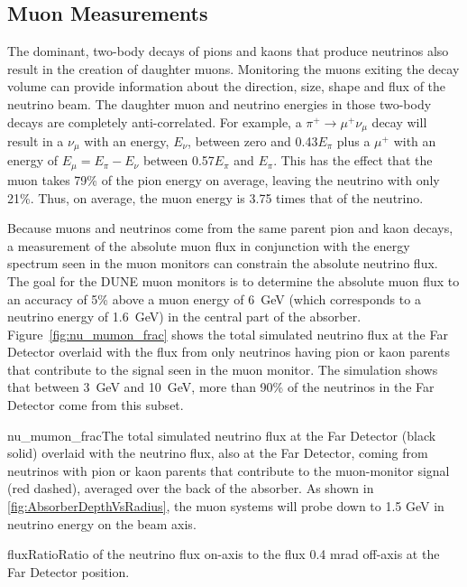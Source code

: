 \subsection{Muon Measurements}
\label{subsec:nd-blm-muon-meas}
The dominant, two-body decays of pions and kaons that produce
neutrinos also result in the creation of daughter muons. Monitoring
the muons exiting the decay volume can provide information about the
direction, size, shape and flux of the neutrino beam.  The daughter
muon and neutrino energies in those two-body decays are completely
anti-correlated. For example, a $\pi^+\rightarrow \mu^+\nu_\mu$
decay will result in a $\nu_\mu$ with an energy, $E_\nu$, between
zero and 0.43$E_\pi$ plus a $\mu^+$ with an energy of 
$E_\mu=E_\pi-E_\nu$ between 0.57$E_\pi$ and $E_\pi$. This has the
effect that the muon takes 79\% of the pion energy on average,  
leaving the neutrino with only  21\%. Thus, on average, the
muon energy is 3.75 times that of the neutrino.

Because muons and neutrinos come from the same parent pion and kaon
decays, a measurement of the absolute muon flux in conjunction with the energy spectrum
seen in the muon monitors can constrain the absolute neutrino flux.  The
goal for the DUNE muon monitors is to determine the absolute muon flux
to an accuracy of 5\% above a muon energy of 6~GeV (which corresponds to
a neutrino energy of 1.6~GeV) in the central part of the absorber.
Figure~\ref{fig:nu_mumon_frac} shows the total simulated neutrino flux at the Far Detector overlaid with the flux from only neutrinos having pion or kaon parents that contribute to the signal
seen in the muon monitor.  The simulation shows that between 3~GeV and 10~GeV, more than 90\% of 
the neutrinos in the Far Detector come from this subset.

\begin{cdrfigure}{nu_mumon_frac}{The total simulated neutrino flux at the Far Detector (black solid) overlaid with the neutrino flux, also at the Far Detector, coming from
neutrinos with pion or kaon parents that contribute to the muon-monitor signal (red dashed), averaged over the back of the absorber. As shown in \ref{fig:AbsorberDepthVsRadius}, the muon systems will probe down to 1.5 GeV in neutrino energy on the beam axis.}
\end{cdrfigure}

\begin{cdrfigure}{fluxRatio}{Ratio of the neutrino flux on-axis to the flux 0.4 mrad off-axis at the Far
Detector position.}
\end{cdrfigure}


